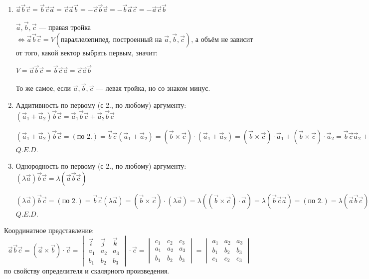 \begin{enumerate}
          \(V = |\vec a \times \vec b| \cdot ||\vec c| \cos \varphi| = |(\vec a \times \vec b) \cdot \vec c| = |\vec a \vec b \vec c|\) \(Q.E.D.\)
    \item \(\vec a \vec b \vec c = \vec b \vec c \vec a = \vec c \vec a \vec b = -\vec c \vec b \vec a = -\vec b \vec a \vec c = -\vec a \vec c \vec b\)

          \(\vec a, \vec b, \vec c\) --- правая тройка \(\Leftrightarrow \vec a \vec b \vec c = V(\text{параллелепипед, построенный на } \vec a, \vec b, \vec c)\),
          а объём не зависит от того, какой вектор выбрать первым, значит:

          \(V = \vec a \vec b \vec c = \vec b \vec c \vec a = \vec c \vec a \vec b\)

          То же самое, если \(\vec a, \vec b, \vec c\) --- левая тройка, но со знаком минус.

    \item Аддитивность по первому (с 2., по любому) аргументу:
          \((\vec a_1 + \vec a_2)\vec b \vec c = \vec a_1 \vec b \vec c + \vec a_2 \vec b \vec c\)

          \((\vec a_1 + \vec a_2)\vec b \vec c = (\text{по 2.}) = \vec b \vec c (\vec a_1 + \vec a_2) =
          (\vec b \times \vec c) \cdot (\vec a_1 + \vec a_2) =
          (\vec b \times \vec c) \cdot \vec a_1 + (\vec b \times \vec c) \cdot \vec a_2 =
          \vec b \vec c \vec a_2 + \vec b \vec c \vec a_1 = (\text{по 2.}) =
          \vec a_1 \vec b \vec c + \vec a_2 \vec b \vec c\) \(Q.E.D.\)
    \item Однородность по первому (с 2., по любому) аргументу:
          \((\lambda\vec a)\vec b \vec c = \lambda(\vec a \vec b \vec c)\)

          \((\lambda\vec a)\vec b \vec c = (\text{по 2.}) = \vec b \vec c (\lambda\vec a) =
          (\vec b \times \vec c) \cdot (\lambda\vec a) =
          \lambda((\vec b \times \vec c) \cdot \vec a) =
          \lambda(\vec b \vec c \vec a) = (\text{по 2.}) =
          \lambda(\vec a \vec b \vec c)\) \(Q.E.D.\)
\end{enumerate}

Координатное представление:
\[\vec a \vec b \vec c = (\vec a \times \vec b) \cdot \vec c =
\begin{vmatrix}
    \vec i & \vec j & \vec k \\
    a_1    & a_2    & a_3    \\
    b_1    & b_2    & b_3
\end{vmatrix} \cdot \vec c =
\begin{vmatrix}
    c_1 & c_2 & c_3 \\
    a_1 & a_2 & a_3 \\
    b_1 & b_2 & b_3
\end{vmatrix} =
\begin{vmatrix}
    a_1 & a_2 & a_3 \\
    b_1 & b_2 & b_3 \\
    c_1 & c_2 & c_3
\end{vmatrix}\]
по свойству определителя и скалярного произведения.

